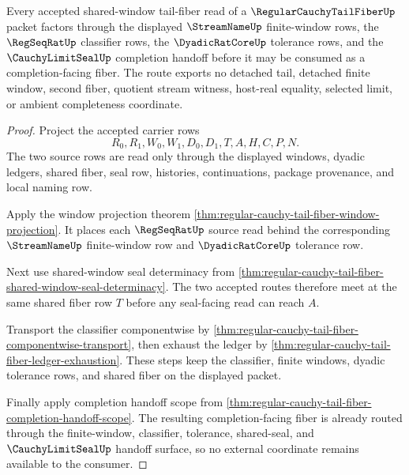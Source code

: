 \begin{theorem}
\label{thm:regular-cauchy-tail-fiber-meet-route}
Every accepted shared-window tail-fiber read of a $\RegularCauchyTailFiberUp$ packet factors through the displayed $\StreamNameUp$ finite-window rows, the $\RegSeqRatUp$ classifier rows, the $\DyadicRatCoreUp$ tolerance rows, and the $\CauchyLimitSealUp$ completion handoff before it may be consumed as a completion-facing fiber. The route exports no detached tail, detached finite window, second fiber, quotient stream witness, host-real equality, selected limit, or ambient completeness coordinate.
\end{theorem}
\begin{proof}
Project the accepted carrier rows
$$
R_0,R_1,W_0,W_1,D_0,D_1,T,A,H,C,P,N.
$$
The two source rows are read only through the displayed windows, dyadic ledgers, shared fiber, seal row, histories, continuations, package provenance, and local naming row.

Apply the window projection theorem \autoref{thm:regular-cauchy-tail-fiber-window-projection}. It places each $\RegSeqRatUp$ source read behind the corresponding $\StreamNameUp$ finite-window row and $\DyadicRatCoreUp$ tolerance row.

Next use shared-window seal determinacy from \autoref{thm:regular-cauchy-tail-fiber-shared-window-seal-determinacy}. The two accepted routes therefore meet at the same shared fiber row $T$ before any seal-facing read can reach $A$.

Transport the classifier componentwise by \autoref{thm:regular-cauchy-tail-fiber-componentwise-transport}, then exhaust the ledger by \autoref{thm:regular-cauchy-tail-fiber-ledger-exhaustion}. These steps keep the classifier, finite windows, dyadic tolerance rows, and shared fiber on the displayed packet.

Finally apply completion handoff scope from \autoref{thm:regular-cauchy-tail-fiber-completion-handoff-scope}. The resulting completion-facing fiber is already routed through the finite-window, classifier, tolerance, shared-seal, and $\CauchyLimitSealUp$ handoff surface, so no external coordinate remains available to the consumer.
\end{proof}

